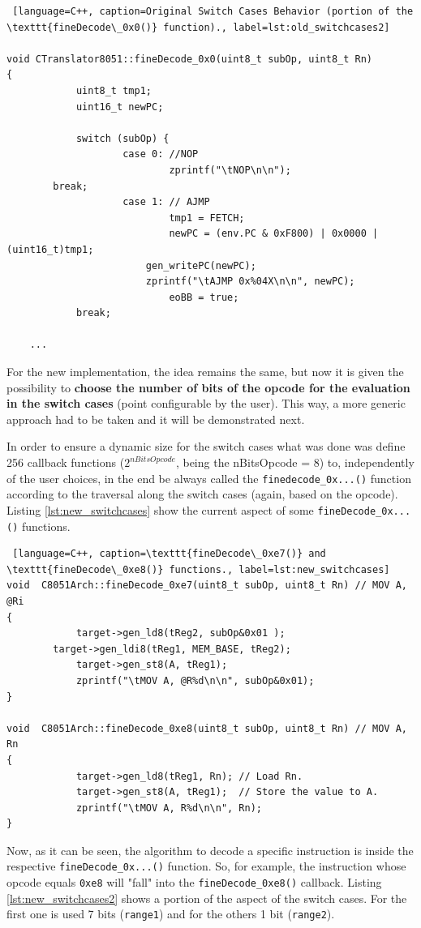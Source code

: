 \begin{lstlisting} [language=C++, caption=Original Switch Cases Behavior (portion of the \texttt{fineDecode\_0x0()} function)., label=lst:old_switchcases2]

void CTranslator8051::fineDecode_0x0(uint8_t subOp, uint8_t Rn)
{
			uint8_t tmp1;
			uint16_t newPC;
		
			switch (subOp) {
					case 0: //NOP
							zprintf("\tNOP\n\n");
	  	break;
					case 1: // AJMP
							tmp1 = FETCH;
							newPC = (env.PC & 0xF800) | 0x0000 | (uint16_t)tmp1; 
	    				gen_writePC(newPC);		
	    				zprintf("\tAJMP 0x%04X\n\n", newPC);
							eoBB = true;		
			break;
		
    ...

\end{lstlisting}

For the new implementation, the idea remains the same, but now it is given the possibility to \textbf{choose the number of bits of the opcode for the evaluation in the switch cases} (point configurable by the user). This way, a more generic approach had to be taken and it will be demonstrated next.


  In order to ensure a dynamic size for the switch cases what was done was define 256 callback functions ($2^{nBitsOpcode}$, being the nBitsOpcode = 8) to, independently of the user choices, in the end be always called the \texttt{finedecode\_0x...()} function according to the traversal along the switch cases (again, based on the opcode). Listing \ref{lst:new_switchcases} show the current aspect of some \texttt{fineDecode\_0x...()} functions.

\begin{lstlisting} [language=C++, caption=\texttt{fineDecode\_0xe7()} and \texttt{fineDecode\_0xe8()} functions., label=lst:new_switchcases]
void  C8051Arch::fineDecode_0xe7(uint8_t subOp, uint8_t Rn)	// MOV A, @Ri
{   
			target->gen_ld8(tReg2, subOp&0x01 );
  		target->gen_ldi8(tReg1, MEM_BASE, tReg2);
			target->gen_st8(A, tReg1);
			zprintf("\tMOV A, @R%d\n\n", subOp&0x01);  
} 

void  C8051Arch::fineDecode_0xe8(uint8_t subOp, uint8_t Rn)	// MOV A, Rn
{   
			target->gen_ld8(tReg1, Rn); // Load Rn.
			target->gen_st8(A, tReg1);  // Store the value to A.
			zprintf("\tMOV A, R%d\n\n", Rn); 
}
\end{lstlisting}

Now, as it can be seen, the algorithm to decode a specific instruction is inside the respective \texttt{fineDecode\_0x...()} function. So, for example, the instruction whose opcode equals \texttt{0xe8} will "fall" into the \texttt{fineDecode\_0xe8()} callback. Listing \ref{lst:new_switchcases2} shows a portion of the aspect of the switch cases. For the first one is used 7 bits (\texttt{range1}) and for the others 1 bit (\texttt{range2}).

